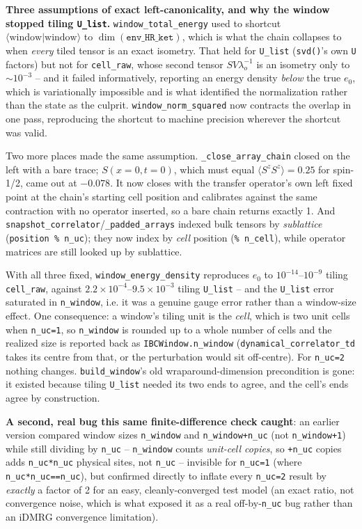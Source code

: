\documentclass[11pt]{article}
\begin{document}
\textbf{Three assumptions of exact left-canonicality, and why the window
stopped tiling \texttt{U\_list}.} \texttt{window\_total\_energy} used to
shortcut $\langle\text{window}|\text{window}\rangle$ to
$\dim(\texttt{env\_HR\_ket})$, which is what the chain collapses to when
\emph{every} tiled tensor is an exact isometry. That held for
\texttt{U\_list} (\texttt{svd()}'s own \texttt{U} factors) but not for
\texttt{cell\_raw}, whose second tensor $S V \lambda_o^{-1}$ is an
isometry only to ${\sim}10^{-3}$ -- and it failed informatively,
reporting an energy density \emph{below} the true $e_0$, which is
variationally impossible and is what identified the normalization rather
than the state as the culprit. \texttt{window\_norm\_squared} now
contracts the overlap in one pass, reproducing the shortcut to machine
precision wherever the shortcut was valid.

Two more places made the same assumption.
\texttt{\_close\_array\_chain} closed on the left with a bare trace;
$S(x=0,t=0)$, which must equal $\langle S^z S^z\rangle = 0.25$ for
spin-1/2, came out at $-0.078$. It now closes with the transfer
operator's own left fixed point at the chain's starting cell position and
calibrates against the same contraction with no operator inserted, so a
bare chain returns exactly 1. And
\texttt{snapshot\_correlator}/\texttt{\_padded\_arrays} indexed bulk
tensors by \emph{sublattice} (\texttt{position \% n\_uc}); they now index
by \emph{cell} position (\texttt{\% n\_cell}), while operator matrices are
still looked up by sublattice.

With all three fixed, \texttt{window\_energy\_density} reproduces $e_0$ to
$10^{-14}$--$10^{-9}$ tiling \texttt{cell\_raw}, against
$2.2\times10^{-4}$--$9.5\times10^{-3}$ tiling \texttt{U\_list} -- and the
\texttt{U\_list} error saturated in \texttt{n\_window}, i.e. it was a
genuine gauge error rather than a window-size effect. One consequence: a
window's tiling unit is the \emph{cell}, which is two unit cells when
\texttt{n\_uc=1}, so \texttt{n\_window} is rounded up to a whole number of
cells and the realized size is reported back as
\texttt{IBCWindow.n\_window} (\texttt{dynamical\_correlator\_td} takes its
centre from that, or the perturbation would sit off-centre). For
\texttt{n\_uc=2} nothing changes. \texttt{build\_window}'s old
wraparound-dimension precondition is gone: it existed because tiling
\texttt{U\_list} needed its two ends to agree, and the cell's ends agree
by construction.

\textbf{A second, real bug
this same finite-difference check caught}: an earlier version compared
window sizes \texttt{n\_window} and \texttt{n\_window+n\_uc} (not
\texttt{n\_window+1}) while still dividing by \texttt{n\_uc} --
\texttt{n\_window} counts \emph{unit-cell copies}, so \texttt{+n\_uc}
copies adds \texttt{n\_uc*n\_uc} physical sites, not \texttt{n\_uc} --
invisible for \texttt{n\_uc=1} (where \texttt{n\_uc*n\_uc==n\_uc}), but
confirmed directly to inflate every \texttt{n\_uc=2} result by
\emph{exactly} a factor of 2 for an easy, cleanly-converged test
model (an exact ratio, not convergence noise, which is what exposed it
as a real off-by-\texttt{n\_uc} bug rather than an iDMRG convergence
limitation).
\end{document}
